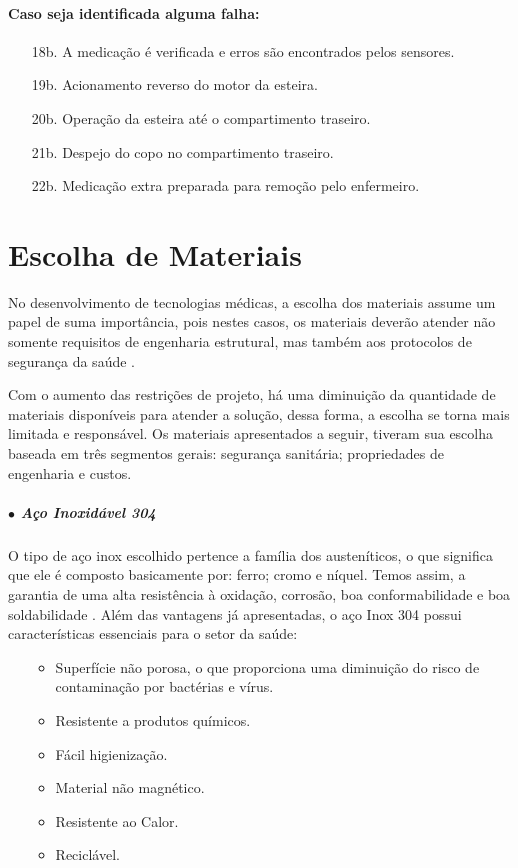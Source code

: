 \paragraph*{Caso seja identificada alguma falha:}

\begin{enumerate}
    \item[18b.] A medicação é verificada e erros são encontrados pelos sensores.
    \item[19b.] Acionamento reverso do motor da esteira.
    \item[20b.] Operação da esteira até o compartimento traseiro.
    \item[21b.] Despejo do copo no compartimento traseiro.
    \item[22b.] Medicação extra preparada para remoção pelo enfermeiro.
\end{enumerate}

\section{Escolha de Materiais}
No desenvolvimento de tecnologias médicas, a escolha dos materiais assume um papel de suma importância, pois nestes casos, os materiais deverão atender não somente requisitos de engenharia estrutural, mas também aos protocolos de segurança da saúde \cite{Steel_Group}.

Com o aumento das restrições de projeto, há uma diminuição da quantidade de materiais disponíveis para atender a solução, dessa forma, a escolha se torna mais limitada e responsável. Os materiais apresentados a seguir, tiveram sua escolha baseada em três segmentos gerais: segurança sanitária; propriedades de engenharia e custos.

\subparagraph*{$\bullet$ Aço Inoxidável 304} \hfill

O tipo de aço inox escolhido pertence a família dos austeníticos, o que significa que ele é composto basicamente por: ferro; cromo e níquel. Temos assim, a garantia de uma alta resistência à oxidação, corrosão, boa conformabilidade e boa soldabilidade \cite{Askeland_Wright_2019}. Além das vantagens já apresentadas, o aço Inox 304 possui características essenciais para o setor da saúde:
\begin{itemize}
    \item []

    \begin{itemize}
        \item Superfície não porosa, o que proporciona uma diminuição do risco de contaminação por bactérias e vírus.
        \item Resistente a produtos químicos.
        \item Fácil higienização.
        \item Material não magnético. 
        \item Resistente ao Calor.
        \item Reciclável.
    \end{itemize}
\end{itemize}
    

